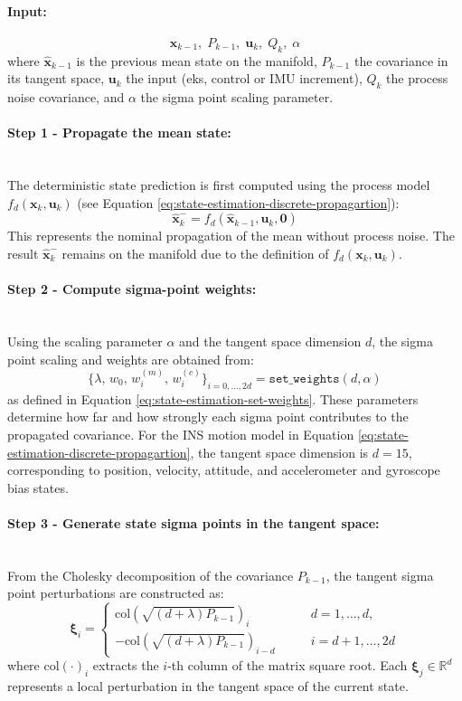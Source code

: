 \paragraph{Input:} 
$$
    \hat{\mathbf{x}}_{k-1}, \; P_{k-1}, \; \mathbf{u}_k, \; Q_k, \; \alpha
$$
where $\hat{\mathbf{x}}_{k-1}$ is the previous mean state on the manifold, $P_{k-1}$ the covariance in its tangent space, $\mathbf{u}_k$ the input (eks, control or IMU increment), $Q_k$ the process noise covariance, and $\alpha$ the sigma point scaling parameter.

\paragraph{Step 1 - Propagate the mean state:} \mbox{}\\[0.5em] \noindent
The deterministic state prediction is first computed using the process model $f_d(\mathbf{x}_k, \mathbf{u}_k)$ (see Equation \ref{eq:state-estimation-discrete-propagartion}):
$$
    \hat{\mathbf{x}}_{k}^{-} = f_d(\hat{\mathbf{x}}_{k-1}, \mathbf{u}_k, \mathbf{0})
$$
This represents the nominal propagation of the mean without process noise. The result $\hat{\mathbf{x}}_{k}^{-}$ remains on the manifold due to the definition of $f_d(\mathbf{x}_k, \mathbf{u}_k)$.

\paragraph{Step 2 - Compute sigma-point weights:} \mbox{}\\[0.5em] \noindent
Using the scaling parameter $\alpha$ and the tangent space dimension $d$, the sigma point scaling and weights are obtained from:
$$
    \{\lambda,\, w_0,\, w_i^{(m)},\, w_i^{(c)}\}_{i=0,\ldots,2d} = \texttt{set\_weights}(d, \alpha)
$$
as defined in Equation \ref{eq:state-estimation-set-weights}. These parameters determine how far and how strongly each sigma point contributes to the propagated covariance. For the INS motion model in Equation \ref{eq:state-estimation-discrete-propagartion}, the tangent space dimension is $d=15$, corresponding to position, velocity, attitude, and accelerometer and gyroscope bias states.

\paragraph{Step 3 - Generate state sigma points in the tangent space:} \mbox{}\\[0.5em] \noindent
From the Cholesky decomposition of the covariance $P_{k-1}$, the tangent sigma point perturbations are constructed as:
$$
    \boldsymbol{\xi}_i = 
    \begin{cases}
        \text{col}\left(\sqrt{(d+\lambda)P_{k-1}}\right)_i \qquad &d = 1,\ldots,d, \\
        -\text{col}\left(\sqrt{(d+\lambda)P_{k-1}}\right)_{i-d} \qquad &i = d+1,\ldots,2d
    \end{cases}
$$
where $\text{col}(\cdot)_i$ extracts the $i$-th column of the matrix square root. Each $\boldsymbol{\xi}_j \in \mathbb{R}^d$ represents a local perturbation in the tangent space of the current state.

